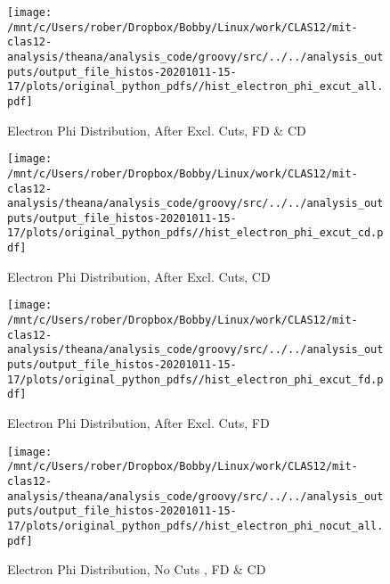 \documentclass{article}
\begin{document}
\begin{landscape}

    \begin{figure}[h]
        \centering

        \texttt{[image: /mnt/c/Users/rober/Dropbox/Bobby/Linux/work/CLAS12/mit-clas12-analysis/theana/analysis\_code/groovy/src/../../analysis\_outputs/output\_file\_histos-20201011-15-17/plots/original\_python\_pdfs//hist\_electron\_phi\_excut\_all.pdf]}
        \captionsetup{textformat=empty,labelformat=blank}
        \caption{Electron Phi Distribution, After Excl. Cuts, FD \& CD}
    \end{figure}
    \clearpage
    
    \begin{figure}[h]
        \centering

        \texttt{[image: /mnt/c/Users/rober/Dropbox/Bobby/Linux/work/CLAS12/mit-clas12-analysis/theana/analysis\_code/groovy/src/../../analysis\_outputs/output\_file\_histos-20201011-15-17/plots/original\_python\_pdfs//hist\_electron\_phi\_excut\_cd.pdf]}
        \captionsetup{textformat=empty,labelformat=blank}
        \caption{Electron Phi Distribution, After Excl. Cuts, CD}
    \end{figure}
    \clearpage
    
    \begin{figure}[h]
        \centering

        \texttt{[image: /mnt/c/Users/rober/Dropbox/Bobby/Linux/work/CLAS12/mit-clas12-analysis/theana/analysis\_code/groovy/src/../../analysis\_outputs/output\_file\_histos-20201011-15-17/plots/original\_python\_pdfs//hist\_electron\_phi\_excut\_fd.pdf]}
        \captionsetup{textformat=empty,labelformat=blank}
        \caption{Electron Phi Distribution, After Excl. Cuts, FD}
    \end{figure}
    \clearpage
    
    \begin{figure}[h]
        \centering

        \texttt{[image: /mnt/c/Users/rober/Dropbox/Bobby/Linux/work/CLAS12/mit-clas12-analysis/theana/analysis\_code/groovy/src/../../analysis\_outputs/output\_file\_histos-20201011-15-17/plots/original\_python\_pdfs//hist\_electron\_phi\_nocut\_all.pdf]}
        \captionsetup{textformat=empty,labelformat=blank}
        \caption{Electron Phi Distribution, No Cuts , FD \& CD}
    \end{figure}
    \clearpage
    
    \begin{figure}[h]
        \centering


\end{figure}
\end{landscape}
\end{document}
